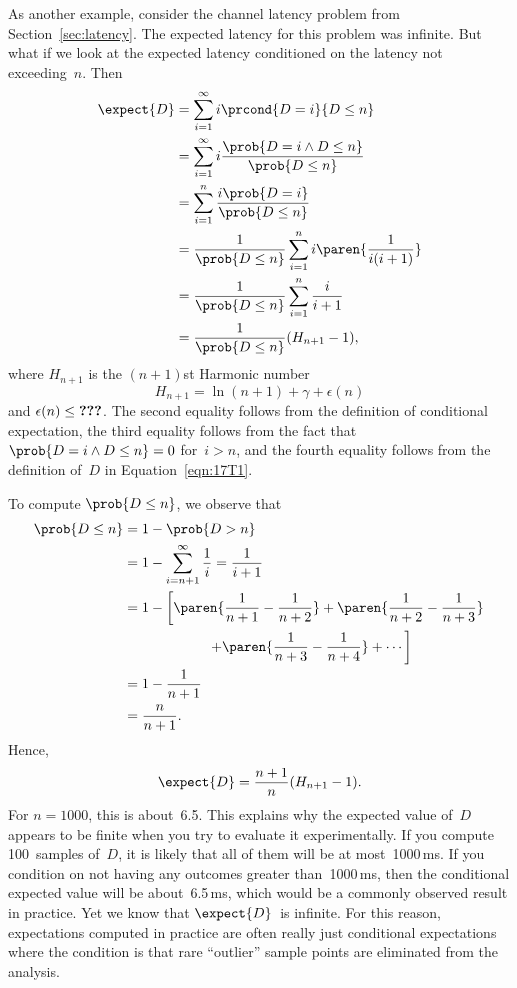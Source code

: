 As another example, consider the channel latency problem from
Section~\ref{sec:latency}.  The expected latency for this problem was
infinite.  But what if we look at the expected latency conditioned on
the latency not exceeding~$n$.  Then
\begin{align*}
\expect{D}
    &= \sum_{i = 1}^\infty i \prcond{D = i}{D \le n} \\
    &= \sum_{i = 1}^\infty i \frac{\prob{D = i \land D \le n}}
                                  {\prob{D \le n}} \\
    &= \sum_{i = 1}^n \frac{i \prob{D = i}}{\prob{D \le n}} \\
    &= \frac{1}{\prob{D \le n}} \sum_{i = 1}^n i \paren{\frac{1}{i(i + 1)}}\\
    &= \frac{1}{\prob{D \le n}} \sum_{i = 1}^n \frac{i}{i + 1} \\
    &= \frac{1}{\prob{D \le n}} (H_{n+ 1} - 1),
\end{align*}
where $H_{n + 1}$ is the $(n + 1)$st Harmonic number
\begin{equation*}
    H_{n + 1} = \ln(n + 1) + \gamma + \epsilon(n)
\end{equation*}
and $\epsilon(n) \le \text{\textbf{???}}$.  The second equality follows from
the definition of conditional expectation, the third equality follows
from the fact that $\prob{D = i \land D \le n} = 0$ for~$i > n$, and
the fourth equality follows from the definition of~$D$ in
Equation~\ref{eqn:17T1}.

To compute $\prob{D \le n}$, we observe that
\begin{align*}
\prob{D \le n}
    &= 1 - \prob{D > n} \\
    &= 1 - \sum_{i = n + 1}^\infty \frac{1}{i} = \frac{1}{i + 1} \\
    &= 1 - \left[ \paren{\frac{1}{n + 1} - \frac{1}{n + 2}}
                + \paren{\frac{1}{n + 2} - \frac{1}{n + 3}} \right. \\
    &\qquad\qquad\qquad \left.           + \paren{\frac{1}{n + 3} - \frac{1}{n + 4}}
                + \cdots \right] \\
    &= 1 - \frac{1}{n + 1} \\
    &= \frac{n}{n + 1}.
\end{align*}
Hence,
\begin{equation}
    \expect{D} = \frac{n + 1}{n} (H_{n + 1} - 1).
\end{equation}
For $n = 1000$, this is about~6.5.  This explains why the expected
value of~$D$ appears to be finite when you try to evaluate it
experimentally.  If you compute 100~samples of~$D$, it is likely that
all of them will be at most~1000\,ms.  If you condition on not having
any outcomes greater than~1000\,ms, then the conditional expected
value will be about~6.5\,ms, which would be a commonly observed result
in practice.  Yet we know that $\expect{D}$~is infinite.  For this
reason, expectations computed in practice are often really just
conditional expectations where the condition is that rare ``outlier''
sample points are eliminated from the analysis.


